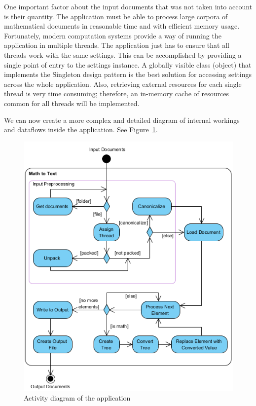 \documentclass[11pt,oneside,final]{fithesis2}
\begin{document}
One important factor about the input documents that was not taken into account is their quantity. The application must be able to process large corpora of mathematical documents in reasonable time and with efficient memory usage. Fortunately, modern computation systems provide a way of running the application in multiple threads. The application just has to ensure that all threads work with the same settings. This can be accomplished by providing a single point of entry to the settings instance. A globally visible class (object) that implements the Singleton design pattern is the best solution for accessing settings across the whole application. Also, retrieving external resources for each single thread is very time consuming; therefore, an in-memory cache of resources common for all threads will be implemented.

We can now create a more complex and detailed diagram of internal workings and dataflows inside the application. See Figure~\ref{fig:activitydiagramall}. 

\begin{figure}[!ht]
\centering
\includegraphics[width=\textwidth]{activity_diagram_all}
\caption{Activity diagram of the application}
\label{fig:activitydiagramall}
\end{figure}
\end{document}
